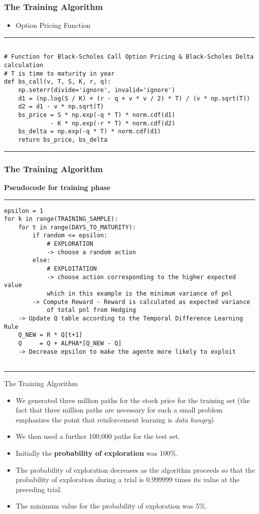 \documentclass[11pt]{beamer}
\begin{document}
\begin{frame}[fragile]
\frametitle{The Training Algorithm}
\scriptsize
	\begin{itemize}
		\item Option Pricing Function
	\end{itemize}

\rule{\textwidth}{1pt}
\begin{verbatim}

# Function for Black-Scholes Call Option Pricing & Black-Scholes Delta calculation
# T is time to maturity in year
def bs_call(v, T, S, K, r, q):
    np.seterr(divide='ignore', invalid='ignore')
    d1 = (np.log(S / K) + (r - q + v * v / 2) * T) / (v * np.sqrt(T))
    d2 = d1 - v * np.sqrt(T)
    bs_price = S * np.exp(-q * T) * norm.cdf(d1) 
             - K * np.exp(-r * T) * norm.cdf(d2)
    bs_delta = np.exp(-q * T) * norm.cdf(d1)
    return bs_price, bs_delta

\end{verbatim}
\rule{\textwidth}{1pt}
\end{frame}
\begin{frame}[fragile]
\frametitle{The Training Algorithm}
\scriptsize
\textbf{Pseudocode for training phase}
\rule{\textwidth}{1pt}
\begin{verbatim}
epsilon = 1
for k in range(TRAINING_SAMPLE):
	for t in range(DAYS_TO_MATURITY):
		if random <= epsilon:
			# EXPLORATION
			-> choose a random action
		else: 
	    	# EXPLOITATION
	    	-> choose action corresponding to the higher expected value
	    	which in this example is the minimum variance of pnl
		-> Compute Reward - Reward is calculated as expected variance 
			of total pnl from Hedging
    -> Update Q table according to the Temporal Difference Learning Rule 
    Q_NEW = R * Q[t+1]
    Q     = Q + ALPHA*[Q_NEW - Q]
    -> Decrease epsilon to make the agente more likely to exploit   		    
	    			
\end{verbatim}
\rule{\textwidth}{1pt}
\end{frame}
\begin{frame}{The Training Algorithm}
	\begin{itemize}
		\item We generated three million paths for the stock price for the training set (the fact that three million paths are necessary for such a small problem emphasizes the point that reinforcement learning is \textit{data hungry}) 
		\item We then used a further 100,000 paths for the test set. 
		\item Initially the \textbf{probability of exploration} was 100\%. 
		\item The probability of exploration decreases as the algorithm proceeds so that the probability of exploration during a trial is 0.999999 times its value at the preceding trial.
		\item The minimum value for the probability of exploration was 5\%.
	\end{itemize}
\end{frame}
\end{document}
